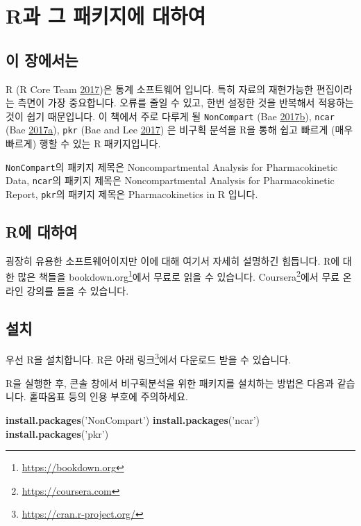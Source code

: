 \documentclass[12pt,]{krantz}
\newenvironment{Shaded}{\begin{snugshade}}{\end{snugshade}}
\newcommand{\KeywordTok}[1]{\textcolor[rgb]{0.13,0.29,0.53}{\textbf{#1}}}
\newcommand{\StringTok}[1]{\textcolor[rgb]{0.31,0.60,0.02}{#1}}
\newcommand{\NormalTok}[1]{#1}
\let\rmarkdownfootnote\footnote%
\def\footnote{\protect\rmarkdownfootnote}
\theoremstyle{definition}
\theoremstyle{definition}
\theoremstyle{definition}
\theoremstyle{remark}
\begin{document}
\chapter{R과 그 패키지에 대하여}\label{R-and-packages}

\section{이 장에서는}\label{summary-r-packages}

R (R Core Team \protect\hyperlink{ref-R-base}{2017})은 통계 소프트웨어
입니다. 특히 자료의 재현가능한 편집이라는 측면이 가장 중요합니다. 오류를
줄일 수 있고, 한번 설정한 것을 반복해서 적용하는 것이 쉽기 때문입니다.
이 책에서 주로 다루게 될 \texttt{NonCompart} (Bae
\protect\hyperlink{ref-R-NonCompart}{2017}\protect\hyperlink{ref-R-NonCompart}{b}),
\texttt{ncar} (Bae
\protect\hyperlink{ref-R-ncar}{2017}\protect\hyperlink{ref-R-ncar}{a}),
\texttt{pkr} (Bae and Lee \protect\hyperlink{ref-R-pkr}{2017}) 은 비구획
분석을 R을 통해 쉽고 빠르게 (매우 빠르게) 행할 수 있는 R 패키지입니다.

\texttt{NonCompart}의 패키지 제목은 Noncompartmental Analysis for
Pharmacokinetic Data, \texttt{ncar}의 패키지 제목은 Noncompartmental
Analysis for Pharmacokinetic Report, \texttt{pkr}의 패키지 제목은
Pharmacokinetics in R 입니다.

\section{R에 대하여}\label{basic}

굉장히 유용한 소프트웨어이지만 이에 대해 여기서 자세히 설명하긴
힘듭니다. R에 대한 많은 책들을 bookdown.org\footnote{\url{https://bookdown.org}}에서
무료로 읽을 수 있습니다. Coursera\footnote{\url{https://coursera.com}}에서
무료 온라인 강의를 들을 수 있습니다.

\section{설치}\label{install}

우선 R을 설치합니다. R은 아래 링크\footnote{\url{https://cran.r-project.org/}}에서
다운로드 받을 수 있습니다.

R을 실행한 후, 콘솔 창에서 비구획분석을 위한 패키지를 설치하는 방법은
다음과 같습니다. 홑따옴표 등의 인용 부호에 주의하세요.

\begin{Shaded}
\begin{Highlighting}[]
\KeywordTok{install.packages}\NormalTok{(}\StringTok{'NonCompart'}\NormalTok{)}
\KeywordTok{install.packages}\NormalTok{(}\StringTok{'ncar'}\NormalTok{)}
\KeywordTok{install.packages}\NormalTok{(}\StringTok{'pkr'}\NormalTok{)}
\end{Highlighting}
\end{Shaded}
\end{document}
